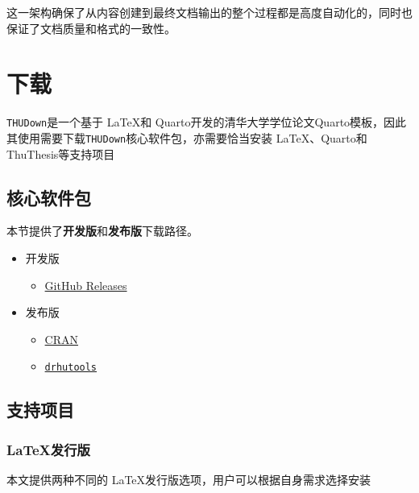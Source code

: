 这一架构确保了从内容创建到最终文档输出的整个过程都是高度自动化的，同时也保证了文档质量和格式的一致性。


\hypertarget{ux4e0bux8f7d}{%
\chapter{下载}\label{ux4e0bux8f7d}}

\texttt{THUDown}是一个基于 \LaTeX 和
Quarto开发的清华大学学位论文Quarto模板，因此其使用需要下载\texttt{THUDown}核心软件包，亦需要恰当安装
\LaTeX 、Quarto和ThuThesis等支持项目

\hypertarget{ux6838ux5fc3ux8f6fux4ef6ux5305}{%
\section{核心软件包}\label{ux6838ux5fc3ux8f6fux4ef6ux5305}}

本节提供了\textbf{开发版}和\textbf{发布版}下载路径。

\begin{itemize}
\item
  开发版

  \begin{itemize}
  \tightlist
  \item
    \href{https://github.com/syfyufei}{GitHub Releases}
  \end{itemize}
\item
  发布版

  \begin{itemize}
  \item
    \href{}{CRAN}
  \item
    \href{https://sammo3182.github.io/software/drhutools/}{\texttt{drhutools}}
  \end{itemize}
\end{itemize}

\hypertarget{ux652fux6301ux9879ux76ee}{%
\section{支持项目}\label{ux652fux6301ux9879ux76ee}}

\hypertarget{ux53d1ux884cux7248}{%
\subsection{\texorpdfstring{\LaTeX 发行版}{发行版}}\label{ux53d1ux884cux7248}}

本文提供两种不同的 \LaTeX 发行版选项，用户可以根据自身需求选择安装

